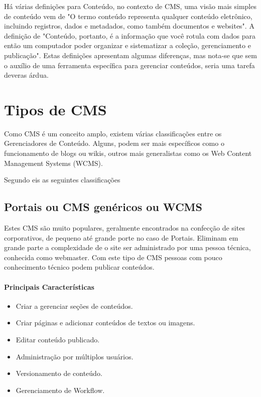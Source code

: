 Há várias definições para Conteúdo, no contexto de CMS, uma visão mais simples de conteúdo vem de \cite{ecm_paper} "O termo conteúdo representa qualquer conteúdo eletrônico, incluindo registros, dados e metadados, como também documentos e websites". 
A definição de \cite{cms_bible} "Conteúdo, portanto, é a informação que você rotula com dados para então um computador poder organizar e sistematizar a coleção, gerenciamento e publicação". Estas definições apresentam algumas diferenças, mas nota-se que sem o auxílio de uma ferramenta específica para gerenciar conteúdos, seria uma tarefa deveras árdua.

\section{Tipos de CMS}

Como CMS é um conceito amplo, existem várias classificações entre os Gerenciadores de Conteúdo. Alguns, podem ser mais específicos como o funcionamento de blogs ou wikis, outros mais generalistas como os Web Content Management Systems (WCMS).

Segundo \cite{choosing_open_source_cms} eis as seguintes classificações

\subsection{Portais ou CMS genéricos ou WCMS} 

Estes CMS são muito populares, geralmente encontrados na confecção de sites corporativos, de pequeno até grande porte no caso de Portais. Eliminam em grande parte a complexidade de o site ser administrado por uma pessoa técnica, conhecida como webmaster. Com este tipo de CMS pessoas com pouco conhecimento técnico podem publicar conteúdos.

\paragraph{Principais Características}

\begin{itemize}
  \item Criar a gerenciar seções de conteúdos.
  \item Criar páginas e adicionar conteúdos de textos ou imagens.
  \item Editar conteúdo publicado.
  \item Administração por múltiplos usuários.
  \item Versionamento de conteúdo.
  \item Gerenciamento de Workflow.
\end{itemize}

